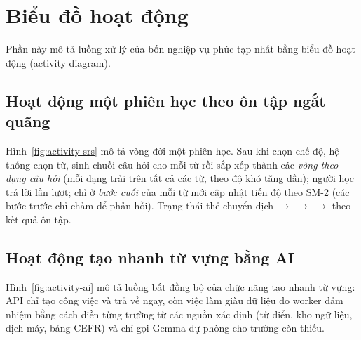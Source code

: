 \section{Biểu đồ hoạt động}
\label{sec:bieu-do-hoat-dong}

Phần này mô tả luồng xử lý của bốn nghiệp vụ phức tạp nhất bằng biểu đồ hoạt
động (activity diagram).

\subsection{Hoạt động một phiên học theo ôn tập ngắt quãng}
\label{subsec:activity-srs}

Hình~\ref{fig:activity-srs} mô tả vòng đời một phiên học. Sau khi chọn chế
độ, hệ thống chọn từ, sinh chuỗi câu hỏi cho mỗi từ rồi sắp xếp thành các
\textit{vòng theo dạng câu hỏi} (mỗi dạng trải trên tất cả các từ, theo độ
khó tăng dần); người học trả lời lần lượt; chỉ ở \textit{bước cuối} của mỗi
từ mới cập nhật tiến độ theo SM-2 (các bước trước chỉ chấm để phản hồi).
Trạng thái thẻ chuyển dịch  $\rightarrow$ 
$\rightarrow$  $\rightarrow$  theo kết quả ôn tập.


\subsection{Hoạt động tạo nhanh từ vựng bằng AI}
\label{subsec:activity-ai}

Hình~\ref{fig:activity-ai} mô tả luồng bất đồng bộ của chức năng tạo nhanh
từ vựng: API chỉ tạo công việc và trả về ngay, còn việc làm giàu dữ liệu do
worker đảm nhiệm bằng cách điền từng trường từ các nguồn xác định (từ điển,
kho ngữ liệu, dịch máy, bảng CEFR) và chỉ gọi Gemma dự phòng cho trường còn
thiếu.

